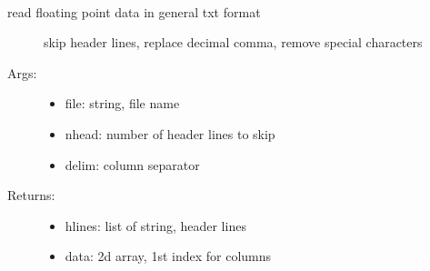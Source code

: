 \documentclass[letterpaper,10pt,english]{sphinxmanual}
\begin{document}
\begin{fulllineitems}
\label{\detokenize{index:PhyPraKit.PhyPraKit.readtxt}}~\begin{description}
\item[{read floating point data in general txt format}] \leavevmode
skip header lines, replace decimal comma, remove special characters

\item[{Args:}] \leavevmode\begin{itemize}
\item {} 
file: string, file name

\item {} 
nhead: number of header lines to skip

\item {} 
delim: column separator

\end{itemize}

\item[{Returns:}] \leavevmode\begin{itemize}
\item {} 
hlines: list of string, header lines

\item {} 
data: 2d array, 1st index for columns

\end{itemize}

\end{description}

\end{fulllineitems}

\end{document}

